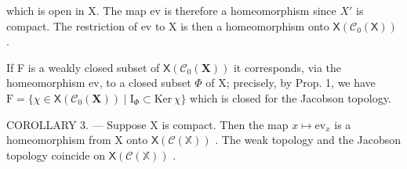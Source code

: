 which is open in X. The map ev is therefore a homeomorphism since \(X'\) is compact. The restriction of ev to X is then a homeomorphism onto \(\mathsf{X}(\mathcal{C}_{0}(\mathsf{X}))\) .

If F is a weakly closed subset of \(\mathsf{X}(\mathcal{C}_{0}(\mathbf{X}))\) it corresponds, via the homeomorphism ev, to a closed subset \(\Phi\) of X; precisely, by Prop. 1, we have \(\mathrm{F} = \{\chi \in \mathsf{X}(\mathcal{C}_{0}(\mathbf{X})) \mid \mathrm{I}_{\Phi} \subset \mathrm{Ker} \, \chi\}\) which is closed for the Jacobson topology.

COROLLARY 3. --- Suppose X is compact. Then the map \(x \mapsto \mathrm{ev}_x\) is a homeomorphism from X onto \(\mathsf{X}(\mathcal{C}(\mathbb{X}))\) . The weak topology and the Jacobson topology coincide on \(\mathsf{X}(\mathcal{C}(\mathbb{X}))\) .
